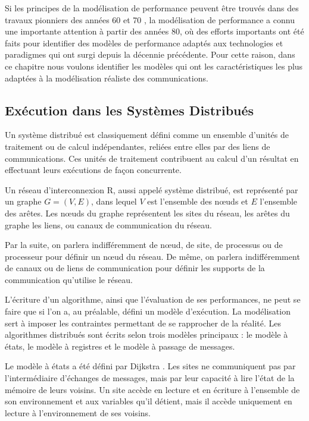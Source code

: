 Si les principes de la modélisation de performance peuvent être trouvés
dans des travaux pionniers des années 60 et 70 \cite{Peterson81},
la modélisation de performance a connu une importante attention à
partir des années 80, où des efforts importants ont été faits pour
identifier des modèles de performance adaptés aux technologies et
paradigmes qui ont surgi depuis la décennie précédente. Pour cette
raison, dans ce chapitre nous voulons identifier les modèles qui ont les caractéristiques
les plus adaptées à la modélisation réaliste des communications.


\subsection{Exécution dans les Systèmes Distribués}

Un système distribué est classiquement défini comme un ensemble
d'unités de traitement ou de calcul indépendantes, reliées entre elles
par des liens de communications. Ces unités de traitement contribuent
au calcul d'un résultat en effectuant leurs exécutions de façon
concurrente.

Un réseau d'interconnexion {\cal R}, aussi appelé système distribué,
est représenté par un graphe $G =(V,E)$, dans lequel $V$ est
l'ensemble des n{\oe}uds et $E$ l'ensemble des arêtes. Les n{\oe}uds
du graphe représentent les sites du réseau, les arêtes du graphe les
liens, ou canaux de communication du réseau.

Par la suite, on parlera indifféremment de n{\oe}ud, de site, de
processus ou de processeur pour définir un n{\oe}ud du réseau. De
même, on parlera indifféremment de canaux ou de liens de communication
pour définir les supports de la communication qu'utilise le réseau.

L'écriture d'un algorithme, ainsi que l'évaluation de ses
performances, ne peut se faire que si l'on a, au préalable, défini un
modèle d'exécution. La modélisation sert à imposer les contraintes
permettant de se rapprocher de la réalité. Les algorithmes distribués
sont écrits selon trois modèles principaux : le modèle à états, le
modèle à registres et le modèle à passage de messages.

Le modèle à états a été défini par Dijkstra \cite{Dij74}. Les sites ne
communiquent pas par l'intermédiaire d'échanges de messages, mais par
leur capacité à lire l'état de la mémoire de leurs voisins. Un site
accède en lecture et en écriture à l'ensemble de son environnement et
aux variables qu'il détient, mais il accède uniquement en lecture à
l'environnement de ses voisins.

